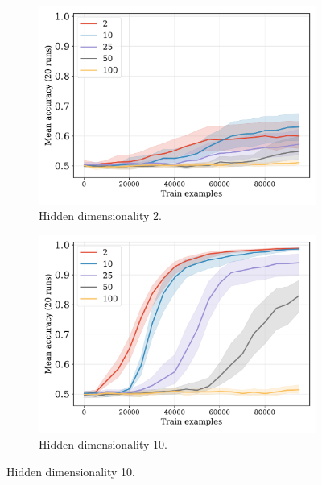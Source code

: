 \documentclass[12pt]{article}
\begin{document}
\begin{figure}[H]
  \centering

  \begin{subfigure}{0.45\linewidth}
    \includegraphics[width=1\textwidth]{fig/flatpremack-h2-train_size-embed_dim-hidden_dim=2.pdf}
    \caption{Hidden dimensionality 2.}
  \end{subfigure}
  \hfill
  \begin{subfigure}{0.45\linewidth}
    \includegraphics[width=1\textwidth]{fig/flatpremack-h2-train_size-embed_dim-hidden_dim=10.pdf}
    \caption{Hidden dimensionality 10.}
  \end{subfigure}


\end{figure}
\end{document}
